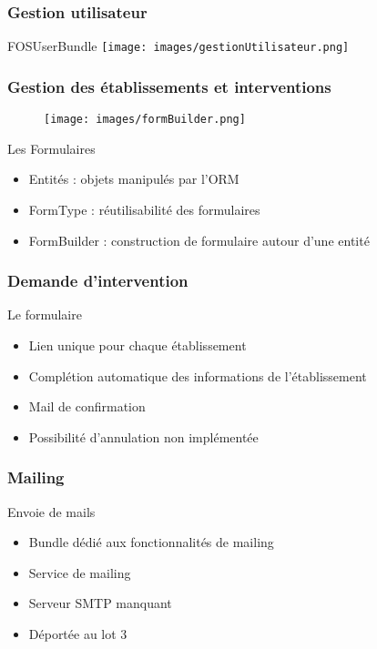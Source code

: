 \speaker{\Florian}

\begin{frame}
\frametitle{Gestion utilisateur}
\begin{block}{FOSUserBundle}
	\texttt{[image: images/gestionUtilisateur.png]}
\end{block}
\end{frame}

\begin{frame}
\frametitle{Gestion des établissements et interventions}
\begin{minipage}[c]{.3\linewidth}
      \begin{figure}[r]
		\texttt{[image: images/formBuilder.png]}
	  \end{figure}
   \end{minipage} \hfill
   \begin{minipage}[c]{.4\linewidth}
      \begin{block}{Les Formulaires}
		\begin{itemize}
			\item Entités : objets manipulés par l'ORM
			\item FormType : réutilisabilité des formulaires
			\item FormBuilder : construction de formulaire autour d'une entité
		\end{itemize}
	  \end{block}
   \end{minipage} \hfill
\end{frame}

\begin{frame}
\frametitle{Demande d'intervention}
\begin{block}{Le formulaire}
	\begin{itemize}
		\item Lien unique pour chaque établissement
		\item Complétion automatique des informations de l'établissement
		\item Mail de confirmation
		\item Possibilité d'annulation non implémentée
	\end{itemize}
\end{block}
\end{frame}

\begin{frame}
\frametitle{Mailing}
\begin{block}{Envoie de mails}
	\begin{itemize}
		\item Bundle dédié aux fonctionnalités de mailing
		\item Service de mailing
		\item Serveur SMTP manquant
		\item Déportée au lot 3
	\end{itemize}
\end{block}
\end{frame}